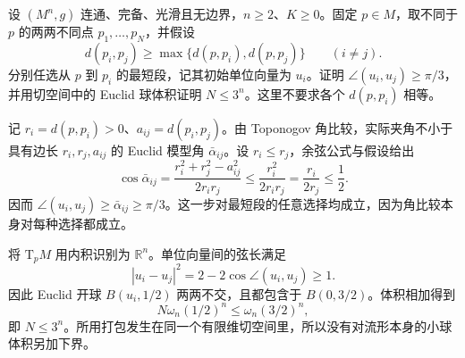 \begin{optionalexercise}\label{g3:ex:toponogov-angular-packing}
 设 \((M^n,g)\) 连通、完备、光滑且无边界，\(n\ge2\)、\(K\ge0\)。固定 \(p\in M\)，取不同于 \(p\) 的两两不同点 \(p_1,\ldots,p_N\)，并假设
 \[
 d(p_i,p_j)\ge\max\{d(p,p_i),d(p,p_j)\}\qquad(i\ne j).
 \]
 分别任选从 \(p\) 到 \(p_i\) 的最短段，记其初始单位向量为 \(u_i\)。证明 \(\angle(u_i,u_j)\ge\pi/3\)，并用切空间中的 Euclid 球体积证明 \(N\le3^n\)。这里不要求各个 \(d(p,p_i)\) 相等。
\end{optionalexercise}
\begin{solution}
 记 \(r_i=d(p,p_i)>0\)、\(a_{ij}=d(p_i,p_j)\)。由 Toponogov 角比较，实际夹角不小于具有边长 \(r_i,r_j,a_{ij}\) 的 Euclid 模型角 \(\bar\alpha_{ij}\)。设 \(r_i\le r_j\)，余弦公式与假设给出
 \[
 \cos\bar\alpha_{ij}
 =\frac{r_i^2+r_j^2-a_{ij}^2}{2r_ir_j}
 \le\frac{r_i^2}{2r_ir_j}
 =\frac{r_i}{2r_j}\le\frac12.
 \]
 因而 \(\angle(u_i,u_j)\ge\bar\alpha_{ij}\ge\pi/3\)。这一步对最短段的任意选择均成立，因为角比较本身对每种选择都成立。

 将 \(\mathrm T_pM\) 用内积识别为 \(\mathbb R^n\)。单位向量间的弦长满足
 \[
 |u_i-u_j|^2=2-2\cos\angle(u_i,u_j)\ge1.
 \]
 因此 Euclid 开球 \(B(u_i,1/2)\) 两两不交，且都包含于 \(B(0,3/2)\)。体积相加得到
 \[
 N\omega_n(1/2)^n\le\omega_n(3/2)^n,
 \]
 即 \(N\le3^n\)。所用打包发生在同一个有限维切空间里，所以没有对流形本身的小球体积另加下界。
\end{solution}


